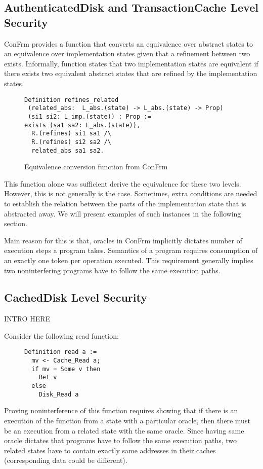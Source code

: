 \subsection{AuthenticatedDisk and TransactionCache Level Security}
ConFrm provides a function that converts an equivalence over abstract states to an equivalence over implementation states given that a refinement between two exists. Informally, function states that two implementation states are equivalent if there exists two equivalent abstract states that are refined by the implementation states.

\begin{figure}[ht]
    \centering
\begin{verbatim}
Definition refines_related 
 (related_abs:  L_abs.(state) -> L_abs.(state) -> Prop)
 (si1 si2: L_imp.(state)) : Prop :=
exists (sa1 sa2: L_abs.(state)),
  R.(refines) si1 sa1 /\
  R.(refines) si2 sa2 /\
  related_abs sa1 sa2.
\end{verbatim}
    \caption{Equivalence conversion function from ConFrm}
    \label{fig:refines_related}
\end{figure}

This function alone was sufficient derive the equivalence for these two levels. However, this is not generally is the case. Sometimes, extra conditions are needed to establish the relation between the parts of the implementation state that is abstracted away. We will present examples of such instances in the following section.

Main reason for this is that, oracles in ConFrm implicitly dictates number of execution steps a program takes. Semantics of a program requires consumption of an exactly one token per operation executed. This requirement generally implies two noninterfering programs have to follow the same execution paths. 


\subsection{CachedDisk Level Security}
{\color{red} INTRO HERE}

Consider the following read function:

\begin{figure}[ht]
    \centering
\begin{verbatim}
Definition read a :=
  mv <- Cache_Read a;
  if mv = Some v then 
    Ret v
  else
    Disk_Read a
\end{verbatim}
    \label{fig:refines_related}
\end{figure}
%
Proving noninterference of this function requires showing that if there is an execution of the function from a state with a particular oracle, then there must be an execution from a related state with the same oracle. Since having same oracle dictates that programs have to follow the same execution paths, two related states have to contain exactly same addresses in their caches (corresponding data could be different).

